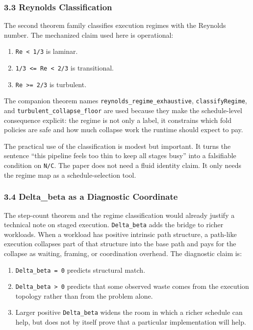 \documentclass[
  11pt,
]{article}
\providecommand{\tightlist}{%
  \setlength{\itemsep}{0pt}\setlength{\parskip}{0pt}}
\begin{document}
\subsubsection{3.3 Reynolds
Classification}\label{reynolds-classification}

The second theorem family classifies execution regimes with the Reynolds
number. The mechanized claim used here is operational:

\begin{enumerate}
\def\labelenumi{\arabic{enumi}.}
\tightlist
\item
  \texttt{Re\ \textless{}\ 1/3} is laminar.
\item
  \texttt{1/3\ \textless{}=\ Re\ \textless{}\ 2/3} is transitional.
\item
  \texttt{Re\ \textgreater{}=\ 2/3} is turbulent.
\end{enumerate}

The companion theorem names \texttt{reynolds\_regime\_exhaustive},
\texttt{classifyRegime}, and \texttt{turbulent\_collapse\_floor} are
used because they make the schedule-level consequence explicit: the
regime is not only a label, it constrains which fold policies are safe
and how much collapse work the runtime should expect to pay.

The practical use of the classification is modest but important. It
turns the sentence ``this pipeline feels too thin to keep all stages
busy'' into a falsifiable condition on \texttt{N/C}. The paper does not
need a fluid identity claim. It only needs the regime map as a
schedule-selection tool.

\subsubsection{3.4 Delta\_beta as a Diagnostic
Coordinate}\label{delta_beta-as-a-diagnostic-coordinate}

The step-count theorem and the regime classification would already
justify a technical note on staged execution. \texttt{Delta\_beta} adds
the bridge to richer workloads. When a workload has positive intrinsic
path structure, a path-like execution collapses part of that structure
into the base path and pays for the collapse as waiting, framing, or
coordination overhead. The diagnostic claim is:

\begin{enumerate}
\def\labelenumi{\arabic{enumi}.}
\tightlist
\item
  \texttt{Delta\_beta\ =\ 0} predicts structural match.
\item
  \texttt{Delta\_beta\ \textgreater{}\ 0} predicts that some observed
  waste comes from the execution topology rather than from the problem
  alone.
\item
  Larger positive \texttt{Delta\_beta} widens the room in which a richer
  schedule can help, but does not by itself prove that a particular
  implementation will help.
\end{enumerate}
\end{document}
